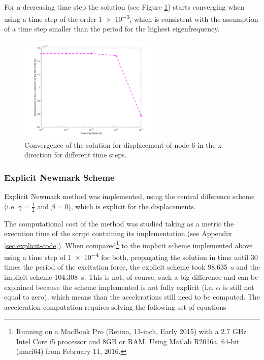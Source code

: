 \documentclass[AMdocument,optEnglish]{AMlatex}  %
\begin{document}
For a decreasing time step the solution (see Figure \ref{fig:convergence}) starts converging when using a time step of the order \num{1e-3}, which is consistent with the assumption of a time step smaller than the period for the highest eigenfrequency.

\begin{figure}[ht] 
	\centering
	\includegraphics[width=0.6\textwidth]{convergence} 
	\caption{Convergence of the solution for displacement of node 6 in the x-direction for different time steps.}
	\label{fig:convergence}
\end{figure}

\subsubsection{Explicit Newmark Scheme}

Explicit Newmark method was implemented, using the central difference scheme (i.e. $\gamma = \frac{1}{2}$ and $\beta = 0$), which is explicit for the displacements.

The computational cost of the method was studied taking as a metric the execution time of the script containing its implementation (see Appendix \ref{sec:explicit-code}). When compared\footnote{Running on a MacBook Pro (Retina, 13-inch, Early 2015) with a 2.7 GHz Intel Core i5 processor and 8GB or RAM. Using Matlab R2016a, 64-bit (maci64) from February 11, 2016.} to the implicit scheme implemented above using a time step of \num{1e-4} for both, propagating the solution in time until 30 times the period of the excitation force, the explicit scheme took \SI{98.635}{\second} and the implicit scheme \SI{104.308}{\second}. This is not, of course, such a big difference and can be explained because the scheme implemented is not fully explicit (i.e. $\alpha$ is still not equal to zero), which means than the accelerations still need to be computed. The acceleration computation requires solving the following set of equations \cite{strucdyn-lecnot}
\end{document}
